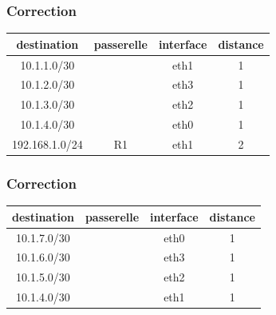 \documentclass[svgnames,11pt]{beamer}
\begin{document}
\begin{frame}
    \frametitle{Correction}

    \begin{center}
        \begin{tabular}{|*{4}{c|}}
            \hline
            destination    & passerelle & interface & distance \\
            \hline
            10.1.1.0/30    &            & eth1      & 1        \\
            \hline
            10.1.2.0/30    &            & eth3      & 1        \\
            \hline
            10.1.3.0/30    &            & eth2      & 1        \\
            \hline
            10.1.4.0/30    &            & eth0      & 1        \\
            \hline
            192.168.1.0/24    &     R1       & eth1      & 2        \\
            \hline
        \end{tabular}
    \end{center}

\end{frame}

\begin{frame}
    \frametitle{Correction}

    \begin{center}
        \begin{tabular}{|*{4}{c|}}
            \hline
            destination    & passerelle & interface & distance \\
            \hline
            10.1.7.0/30    &            & eth0      & 1        \\
            \hline
            10.1.6.0/30    &            & eth3      & 1        \\
            \hline
            10.1.5.0/30    &            & eth2      & 1        \\
            \hline
            10.1.4.0/30    &            & eth1      & 1        \\
            \hline
        \end{tabular}
    \end{center}

\end{frame}
\end{document}
